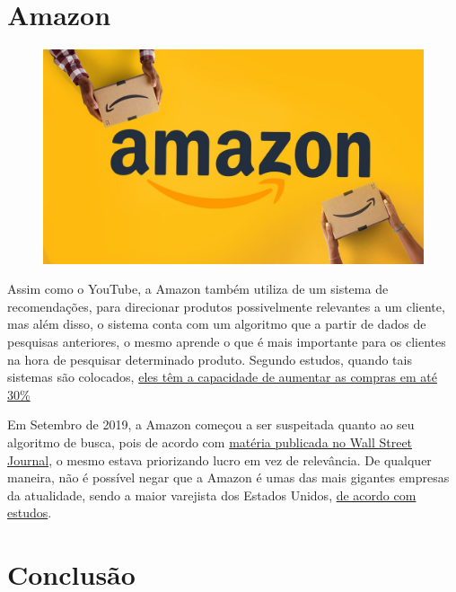 \documentclass[12pt]{article}
\begin{document}
    \newpage
    \section{Amazon} \label{sec:amazon}

    \begin{figure}[htp]
        \centering
        \includegraphics[scale=0.3]{amazon.jpg}
    \end{figure}

    Assim como o YouTube, a Amazon também utiliza de um sistema de recomendações, 
    para direcionar produtos possivelmente relevantes a um cliente, mas além 
    disso, o sistema conta com um algoritmo que a partir de dados de pesquisas
    anteriores, o mesmo aprende o que é mais importante para os clientes na 
    hora de pesquisar determinado produto. Segundo estudos, quando tais 
    sistemas são colocados, \href{https://papers.ssrn.com/sol3/papers.cfm?abstract_id=2263983}
    {eles têm a capacidade de aumentar as compras em até 30\%}

    Em Setembro de 2019, a Amazon começou a ser suspeitada quanto ao seu algoritmo
    de busca, pois de acordo com \href{https://www.wsj.com/articles/amazon-changed-search-algorithm-in-ways-that-boost-its-own-products-11568645345}{matéria publicada no Wall Street Journal},
    o mesmo estava priorizando lucro em vez de relevância. De qualquer maneira, não é possível negar
    que a Amazon é umas das mais gigantes empresas da atualidade, sendo a maior
    varejista dos Estados Unidos, \href{https://www.visualcapitalist.com/amazon-worlds-most-valuable-retailer/}{de acordo com estudos}.


    \newpage
    \section{Conclusão}
\end{document}
